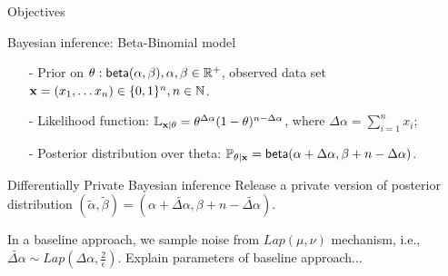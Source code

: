 \documentclass[final,hyperref={pdfpagelabels=false}]{beamer}
\begin{document}
\begin{frame}[t]
\begin{columns}[t]
\begin{column}{.485\textwidth}
\begin{block}{Objectives}
\end{block}

            
\begin{block}{Bayesian inference: Beta-Binomial model}
\begin{itemize}
  \item[-] Prior on $\theta: \mathsf{beta}(\alpha, \beta), \alpha,\beta\in\mathbb{R}^{+}$, observed data set $\textbf{x}= (x_1,\dots x_n)\in\{0,1\}^{n}, n\in\mathbb{N}$.

  \item[-] Likelihood function: $\mathbb{L}_{\textbf{x} | \theta}= \theta^{\Delta \alpha}(1-\theta)^{n - \Delta \alpha}$, where $\Delta \alpha = \displaystyle\sum_{i=1}^{n}x_i$;

  \item[-] Posterior distribution over theta: $\mathbb{P}_{\theta|\textbf{x}}=\mathsf{beta}(\alpha + \Delta \alpha,\beta + n - \Delta \alpha)$.
\end{itemize}
\end{block}


\begin{block}{Differentially Private Bayesian inference}
Release a private version of posterior distribution $(\tilde\alpha,\tilde\beta)=(\alpha +  \widetilde{\Delta \alpha},\beta + n - \widetilde{\Delta \alpha})$.

In a baseline approach, we sample noise from $Lap(\mu,\nu)$ mechanism, i.e., $\widetilde{\Delta \alpha}\sim Lap(\Delta \alpha, \frac{2}{\epsilon})$.
Explain parameters of baseline approach...
\end{block}


\end{column}
\end{columns}
\end{frame}
\end{document}
